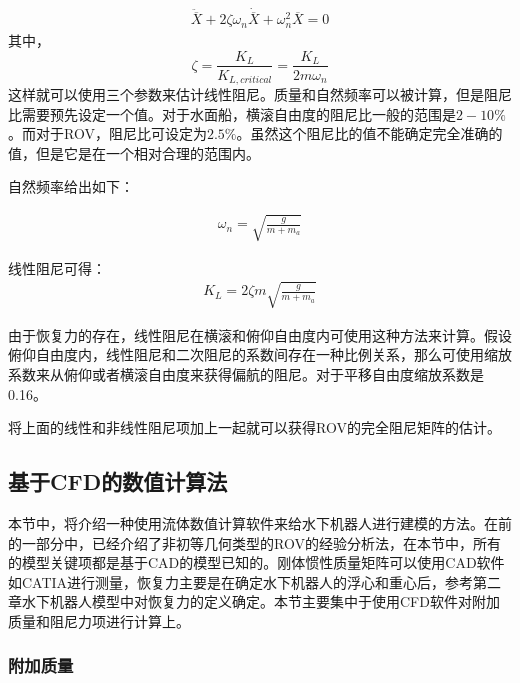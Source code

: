 \begin{equation}
\begin{aligned}
\ddot{\overline{X}} + 2\zeta \omega_n \dot{\overline{X}} + \omega_n^2 \overline{X} = 0
\end{aligned}
\end{equation}
其中，
\begin{equation}
\zeta = \frac{K_L}{K_{L,critical}} = \frac{K_L}{2m\omega_n}
\end{equation}
这样就可以使用三个参数来估计线性阻尼。质量和自然频率可以被计算，但是阻尼比需要预先设定一个值。对于水面船，横滚自由度的阻尼比一般的范围是$2-10\%$。而对于ROV，阻尼比可设定为$2.5\%$。虽然这个阻尼比的值不能确定完全准确的值，但是它是在一个相对合理的范围内。

自然频率给出如下：

\begin{equation}
\begin{aligned}
\omega_n =  \sqrt{\frac{g}{m+m_a}}
\end{aligned}
\end{equation}

线性阻尼可得：
\begin{equation}
\begin{aligned}
K_L = 2 \zeta m \sqrt{\frac{g}{m+m_a}}
\end{aligned}
\end{equation}

由于恢复力的存在，线性阻尼在横滚和俯仰自由度内可使用这种方法来计算。假设俯仰自由度内，线性阻尼和二次阻尼的系数间存在一种比例关系，那么可使用缩放系数来从俯仰或者横滚自由度来获得偏航的阻尼。对于平移自由度缩放系数是0.16。

将上面的线性和非线性阻尼项加上一起就可以获得ROV的完全阻尼矩阵的估计。

\subsection{基于CFD的数值计算法}

本节中，将介绍一种使用流体数值计算软件来给水下机器人进行建模的方法。在前的一部分中，已经介绍了非初等几何类型的ROV的经验分析法，在本节中，所有的模型关键项都是基于CAD的模型已知的。刚体惯性质量矩阵可以使用CAD软件如CATIA进行测量，恢复力主要是在确定水下机器人的浮心和重心后，参考第二章水下机器人模型中对恢复力的定义确定。本节主要集中于使用CFD软件对附加质量和阻尼力项进行计算上。

\subsubsection{附加质量}


